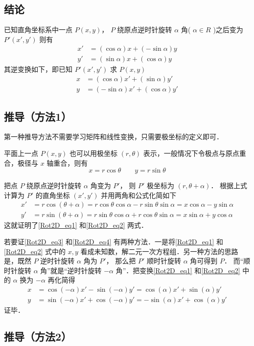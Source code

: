 
\subsection{结论}
已知直角坐标系中一点 $P(x,y)$， $P$ 绕原点逆时针旋转 $\alpha $ 角( $\alpha  \in R$ )之后变为 $P'(x',y')$ 则有
\begin{align}\label{Rot2D_eq1}
x' &= (\cos \alpha)x + (- \sin \alpha)y \\
\label{Rot2D_eq2}
y' &= (\sin \alpha)x + (\cos \alpha)y
\end{align}
其逆变换如下，即已知 $P'(x',y')$ 求 $P(x,y)$ 
\begin{align}\label{Rot2D_eq3}
x &= ( \cos \alpha  )x' + ( \sin \alpha  )y' \\
\label{Rot2D_eq4}
y &= (  - \sin \alpha  )x' + ( \cos \alpha )y'
\end{align}

\subsection{推导（方法1）}

第一种推导方法不需要学习矩阵和线性变换，只需要极坐标的定义即可．

平面上一点 $P( {x,y} )$ 也可以用极坐标 $( {r,\theta } )$ 表示，一般情况下令极点与原点重合，极径与 $x$ 轴重合，则有
\begin{equation}
x = r\cos \theta \qquad y = r\sin \theta 
\end{equation}     

把点 $P$ 绕原点逆时针旋转 $\alpha $ 角变为 $P'$， 则 $P'$ 极坐标为 $( {r,\theta  + \alpha } )$． 根据上式计算为 $P'$ 的直角坐标 $( {x',y'} )$ 并用两角和公式化简如下
\begin{align}
x' &= r\cos ( {\theta  + \alpha } ) = r\cos \theta \cos \alpha  - r\sin \theta \sin \alpha  = x\cos \alpha  - y\sin \alpha \\
y' &= r\sin ( {\theta  + \alpha } ) = r\sin \theta \cos \alpha  + r\cos \theta \sin \alpha  = x\sin \alpha  + y\cos \alpha 
\end{align} 
这就证明了\autoref{Rot2D_eq1} 和\autoref{Rot2D_eq2} 两式．

若要证\autoref{Rot2D_eq3} 和\autoref{Rot2D_eq4} 有两种方法．一是将\autoref{Rot2D_eq1} 和\autoref{Rot2D_eq2} 式中的 $x, y$ 看成未知数，解二元一次方程组．另一种方法的思路是，既然 $P$ 逆时针旋转 $\alpha $ 角为 $P'$， 那么把 $P'$ 顺时针旋转 $\alpha $ 角可得到 $P$． 而“顺时针旋转 $\alpha $ 角”就是“逆时针旋转 $ - \alpha $ 角”．把变换\autoref{Rot2D_eq1} 和\autoref{Rot2D_eq2} 中的 $\alpha $ 换为 $ - \alpha $ 再化简得
 \begin{align}
x &= \cos ( { - \alpha } )x' - \sin ( { - \alpha } )y' = \cos ( \alpha  )x' + \sin ( \alpha  )y'\\
y &= \sin(-\alpha)x' + \cos(- \alpha)y' =  -\sin(\alpha)x' + \cos(\alpha)y'
\end{align}
证毕．

\subsection{推导（方法2）}
